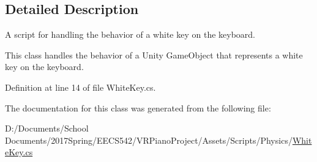 \subsection{Detailed Description}
A script for handling the behavior of a white key on the keyboard. 

This class handles the behavior of a Unity Game\+Object that represents a white key on the keyboard. 

Definition at line 14 of file White\+Key.\+cs.



The documentation for this class was generated from the following file\+:\begin{DoxyCompactItemize}
\item 
D\+:/\+Documents/\+School Documents/2017\+Spring/\+E\+E\+C\+S542/\+V\+R\+Piano\+Project/\+Assets/\+Scripts/\+Physics/\hyperlink{_white_key_8cs}{White\+Key.\+cs}\end{DoxyCompactItemize}
